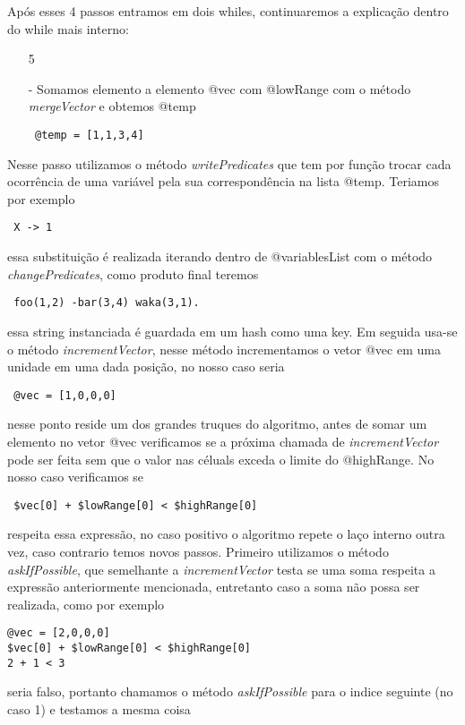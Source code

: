 \documentclass[a4paper]{article}
\begin{document}
Após esses 4 passos entramos em dois whiles, continuaremos a explicação dentro do while mais interno:

\begin{itemize}
\item[5]{- Somamos elemento a elemento @vec com @lowRange com o método \textit{mergeVector} e obtemos @temp 
\begin{verbatim} @temp = [1,1,3,4] \end{verbatim}}
\end{itemize}
Nesse passo utilizamos o método \textit{writePredicates} que tem por função trocar cada ocorrência de uma variável pela sua correspondência na lista @temp. Teriamos por exemplo 
\begin{verbatim} X -> 1 \end{verbatim}
essa substituição é realizada iterando dentro de @variablesList com o método \textit{changePredicates}, como produto final teremos
\begin{verbatim} foo(1,2) -bar(3,4) waka(3,1). \end{verbatim}

essa string instanciada é guardada em um hash como uma key. Em seguida usa-se o método \textit{incrementVector}, nesse método incrementamos o vetor @vec em uma unidade em uma dada posição, no nosso caso seria 
\begin{verbatim} @vec = [1,0,0,0] \end{verbatim}
nesse ponto reside um dos grandes truques do algoritmo, antes de somar um elemento no vetor @vec verificamos se a próxima chamada de \textit{incrementVector} pode ser feita sem que o valor nas céluals exceda o limite do @highRange. No nosso caso verificamos se  
\begin{verbatim} $vec[0] + $lowRange[0] < $highRange[0]\end{verbatim}

respeita essa expressão, no caso positivo o algoritmo repete o laço interno outra vez, caso contrario temos novos passos. Primeiro utilizamos o método \textit{askIfPossible}, que semelhante a \textit{incrementVector} testa se uma soma respeita a expressão anteriormente mencionada, entretanto caso a soma não possa ser realizada, como por exemplo

\begin{verbatim} 
@vec = [2,0,0,0] 
$vec[0] + $lowRange[0] < $highRange[0]
2 + 1 < 3
\end{verbatim}
seria falso, portanto chamamos o método \textit{askIfPossible} para o indice seguinte (no caso 1) e testamos a mesma coisa
\end{document}
